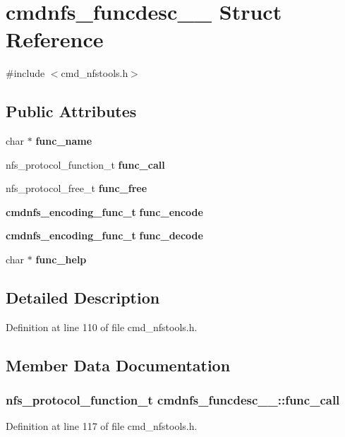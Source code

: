 \section{cmdnfs\_\-funcdesc\_\-\_\- Struct Reference}
\label{structcmdnfs__funcdesc____}


{\ttfamily \#include $<$cmd\_\-nfstools.h$>$}\subsection*{Public Attributes}
\begin{DoxyCompactItemize}
\item 
char $\ast$ {\bf func\_\-name}
\item 
nfs\_\-protocol\_\-function\_\-t {\bf func\_\-call}
\item 
nfs\_\-protocol\_\-free\_\-t {\bf func\_\-free}
\item 
{\bf cmdnfs\_\-encoding\_\-func\_\-t} {\bf func\_\-encode}
\item 
{\bf cmdnfs\_\-encoding\_\-func\_\-t} {\bf func\_\-decode}
\item 
char $\ast$ {\bf func\_\-help}
\end{DoxyCompactItemize}


\subsection{Detailed Description}


Definition at line 110 of file cmd\_\-nfstools.h.

\subsection{Member Data Documentation}
\subsubsection[{func\_\-call}]{\setlength{\rightskip}{0pt plus 5cm}nfs\_\-protocol\_\-function\_\-t {\bf cmdnfs\_\-funcdesc\_\-\_\-::func\_\-call}}\label{structcmdnfs__funcdesc_____aebe59d3c24f14b1aba9af94451d1f571}


Definition at line 117 of file cmd\_\-nfstools.h.
